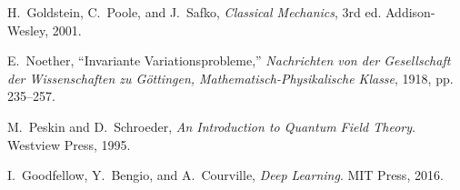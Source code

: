 \documentclass[11pt,a4paper]{article}
\begin{document}
\begin{thebibliography}{9}
H.~Goldstein, C.~Poole, and J.~Safko, \emph{Classical Mechanics}, 3rd ed. Addison-Wesley, 2001.

E.~Noether, ``Invariante Variationsprobleme,'' \emph{Nachrichten von der Gesellschaft der Wissenschaften zu Göttingen, Mathematisch-Physikalische Klasse}, 1918, pp. 235--257.

M.~Peskin and D.~Schroeder, \emph{An Introduction to Quantum Field Theory}. Westview Press, 1995.

I.~Goodfellow, Y.~Bengio, and A.~Courville, \emph{Deep Learning}. MIT Press, 2016.
\end{thebibliography}
\end{document}
